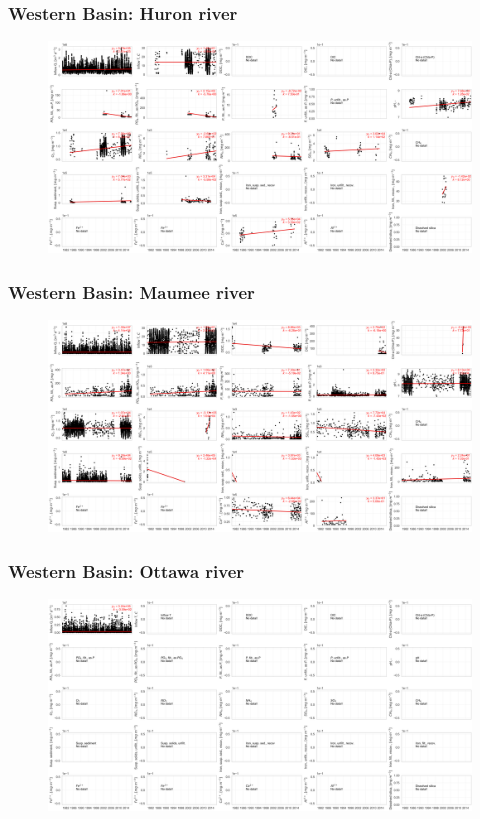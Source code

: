 \documentclass{beamer}
\begin{document}
\begin{frame}
\frametitle{Western Basin: Huron river}

\begin{figure}
\includegraphics[width=\textwidth]{rivers/Western basin/huronriver.png}
\end{figure}

\end{frame}


\begin{frame}
\frametitle{Western Basin: Maumee river}

\begin{figure}
\includegraphics[width=\textwidth]{rivers/Western basin/maumeeriver.png}
\end{figure}

\end{frame}


\begin{frame}
\frametitle{Western Basin: Ottawa river}

\begin{figure}
\includegraphics[width=\textwidth]{rivers/Western basin/ottawariver.png}
\end{figure}

\end{frame}
\end{document}
